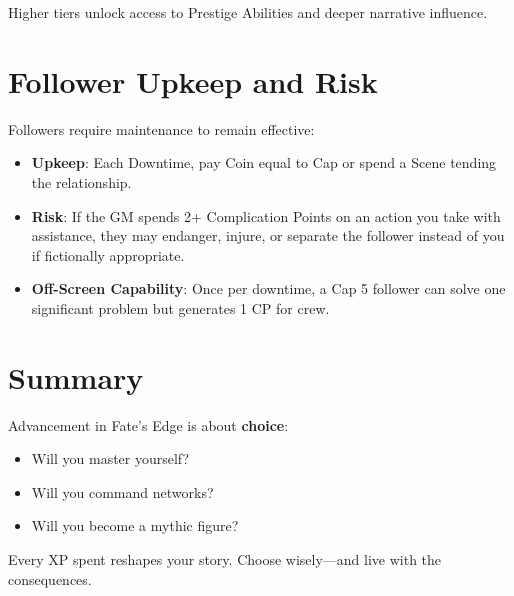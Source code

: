 Higher tiers unlock access to Prestige Abilities and deeper narrative influence.

\section{Follower Upkeep and Risk}

Followers require maintenance to remain effective:

\begin{itemize}
  \item \textbf{Upkeep}: Each Downtime, pay Coin equal to Cap or spend a Scene tending the relationship.
  \item \textbf{Risk}: If the GM spends 2+ Complication Points on an action you take with assistance, they may endanger, injure, or separate the follower instead of you if fictionally appropriate.
  \item \textbf{Off-Screen Capability}: Once per downtime, a Cap 5 follower can solve one significant problem but generates 1 CP for crew.
\end{itemize}

\section{Summary}

Advancement in Fate's Edge is about \textbf{choice}:

\begin{itemize}
  \item Will you master yourself?
  \item Will you command networks?
  \item Will you become a mythic figure?
\end{itemize}

Every XP spent reshapes your story. Choose wisely—and live with the consequences.
